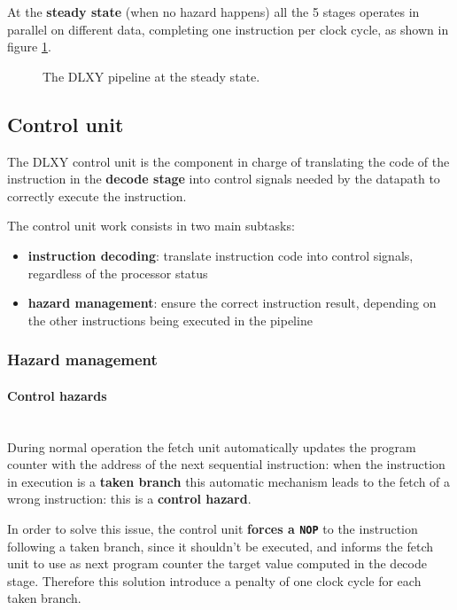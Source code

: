 At the \textbf{steady state} (when no hazard happens) all the 5 stages operates
in parallel on different data, completing one instruction per clock cycle, as
shown in figure \ref{fig:pipeline_steady}.
\begin{figure}[H]
	\centering
	\caption{The DLXY pipeline at the steady state.}
	\label{fig:pipeline_steady}
\end{figure}

\subsection{Control unit}
The DLXY control unit is the component in charge of translating the code
of the instruction in the \textbf{decode stage} into control signals
needed by the datapath to correctly execute the instruction.

\bigskip
The control unit work consists in two main subtasks:
\begin{itemize}
	\item \textbf{instruction decoding}: translate instruction code into
		control signals, regardless of the processor status
	\item \textbf{hazard management}: ensure the correct instruction result,
		depending on the other instructions being executed in the pipeline
\end{itemize}

\subsubsection{Hazard management}

\paragraph{Control hazards} \mbox{} \\
During normal operation the fetch unit automatically updates the program counter
with the address of the next sequential instruction: when the instruction in
execution is a \textbf{taken branch} this automatic mechanism leads to the fetch
of a wrong instruction: this is a \textbf{control hazard}.

\bigskip
In order to solve this issue, the control unit \textbf{forces a \texttt{NOP}} to
the instruction following a taken branch, since it shouldn't be executed, and
informs the fetch unit to use as next program counter the target value computed
in the decode stage. Therefore this solution introduce a penalty of one clock
cycle for each taken branch.

